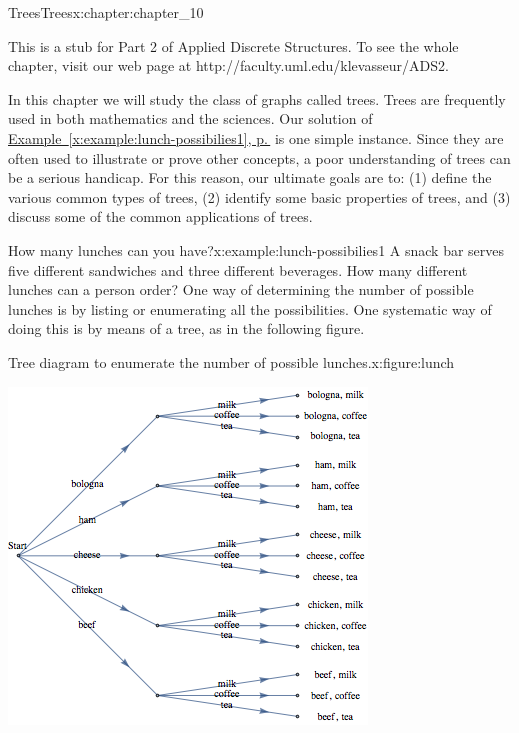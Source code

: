 \documentclass[twoside,10pt,]{book}
\newcommand{\xreffont}{\relax}
\numberwithin{equation}{section}
\begin{document}
\begin{chapterptx}{Trees}{}{Trees}{}{}{x:chapter:chapter_10}
\begin{introduction}{}%
This is a stub for Part 2 of Applied Discrete Structures. To see the whole chapter, visit our web page at http:\slash{}\slash{}faculty.uml.edu\slash{}klevasseur\slash{}ADS2.%
\par
In this chapter we will study the class of graphs called trees. Trees are frequently used in both mathematics and the sciences. Our solution of \hyperref[x:example:lunch-possibilies1]{Example~{\xreffont\ref{x:example:lunch-possibilies1}}, p.\,\pageref{x:example:lunch-possibilies1}} is one simple instance. Since they are often used to illustrate or prove other concepts, a poor understanding of trees can be a serious handicap. For this reason, our ultimate goals are to: (1) define the various common types of trees, (2) identify some basic properties of trees, and (3) discuss some of the common applications of trees.%
\end{introduction}%
\begin{example}{How many lunches can you have?}{x:example:lunch-possibilies1}%
A snack bar serves five different sandwiches and three different beverages. How many different lunches can a person order? One way of determining the number of possible lunches is by listing or enumerating all the possibilities. One systematic way of doing this is by means of a tree, as in the following figure.%
\begin{figureptx}{Tree diagram to enumerate the number of possible lunches.}{x:figure:lunch}{}%
\begin{image}{0.25}{0.5}{0.25}%
\includegraphics[width=\linewidth]{images/lunch.png}

\end{image}
\end{figureptx}
\end{example}
\end{chapterptx}
\end{document}

